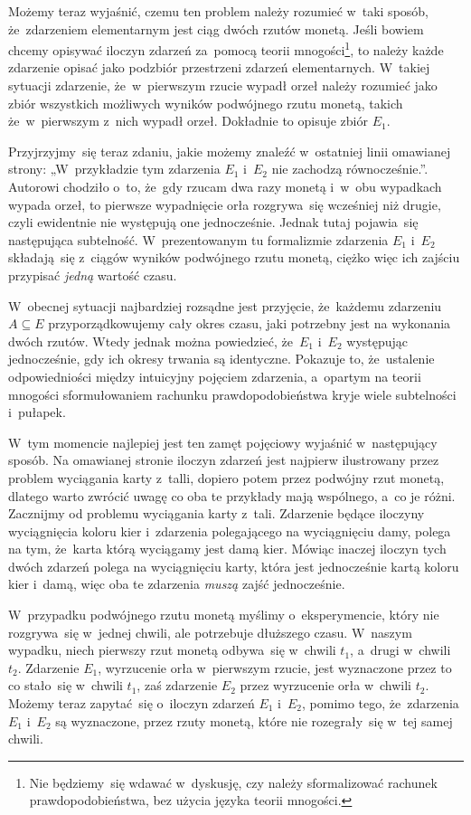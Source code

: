 \documentclass[a4paper,11pt]{article}
\numberwithin{equation}{section}
\begin{document}
Możemy teraz wyjaśnić, czemu ten problem należy rozumieć w~taki sposób,
że~zdarzeniem elementarnym jest ciąg dwóch rzutów monetą. Jeśli bowiem chcemy
opisywać iloczyn zdarzeń za~pomocą teorii mnogości\footnote{Nie będziemy~się
  wdawać w~dyskusję, czy należy sformalizować rachunek prawdopodobieństwa,
  bez użycia języka teorii mnogości.}, to należy każde zdarzenie opisać jako
podzbiór
przestrzeni zdarzeń elementarnych. W~takiej sytuacji zdarzenie,
że~w~pierwszym rzucie wypadł orzeł należy rozumieć jako zbiór wszystkich
możliwych wyników podwójnego rzutu monetą, takich że~w~pierwszym z~nich
wypadł orzeł. Dokładnie to opisuje zbiór $E_{ 1 }$.

Przyjrzyjmy~się teraz zdaniu, jakie możemy znaleźć w~ostatniej linii
omawianej strony: „W~przykładzie tym zdarzenia $E_{ 1 }$ i~$E_{ 2 }$ nie
zachodzą równocześnie.”. Autorowi chodziło o~to, że~gdy rzucam dwa razy
monetą i~w~obu wypadkach wypada orzeł, to pierwsze wypadnięcie orła
rozgrywa~się
wcześniej niż drugie, czyli ewidentnie nie występują one jednocześnie.
Jednak tutaj pojawia~się następująca subtelność. W~prezentowanym tu
formalizmie zdarzenia $E_{ 1 }$ i~$E_{ 2 }$ składają~się z~ciągów wyników
podwójnego rzutu monetą, ciężko więc ich zajściu przypisać \textit{jedną}
wartość czasu.

W~obecnej sytuacji najbardziej rozsądne jest przyjęcie, że~każdemu zdarzeniu
$A \subseteq E$ przyporządkowujemy cały okres czasu, jaki potrzebny jest na
wykonania dwóch rzutów. Wtedy jednak można powiedzieć,
że~$E_{ 1 }$ i~$E_{ 2 }$ występując
jednocześnie, gdy ich okresy trwania są identyczne. Pokazuje to, że~ustalenie
odpowiedniości między intuicyjny pojęciem zdarzenia, a~opartym na teorii
mnogości sformułowaniem rachunku prawdopodobieństwa kryje wiele subtelności
i~pułapek.

W~tym momencie najlepiej jest ten zamęt pojęciowy wyjaśnić w~następujący
sposób. Na omawianej stronie iloczyn zdarzeń jest najpierw ilustrowany przez
problem wyciągania karty z~talli, dopiero potem przez podwójny rzut monetą,
dlatego warto zwrócić uwagę co oba te przykłady mają wspólnego, a~co je
różni. Zacznijmy od problemu wyciągania karty z~tali. Zdarzenie będące
iloczyny wyciągnięcia koloru kier i~zdarzenia polegającego na
wyciągnięciu damy, polega na tym, że~karta którą wyciągamy
jest damą kier. Mówiąc inaczej iloczyn tych dwóch zdarzeń polega na
wyciągnięciu karty, która jest jednocześnie kartą koloru kier i~damą, więc
oba te zdarzenia \textit{muszą} zajść jednocześnie.

W~przypadku podwójnego rzutu monetą myślimy o~eksperymencie, który nie
rozgrywa~się w~jednej chwili, ale potrzebuje dłuższego czasu. W~naszym
wypadku, niech pierwszy rzut monetą odbywa~się w~chwili $t_{ 1 }$, a~drugi
w~chwili~$t_{ 2 }$. Zdarzenie $E_{ 1 }$, wyrzucenie orła w~pierwszym rzucie,
jest wyznaczone przez to co stało~się w~chwili $t_{ 1 }$, zaś zdarzenie
$E_{ 2 }$ przez wyrzucenie orła w~chwili $t_{ 2 }$. Możemy teraz zapytać~się
o~iloczyn zdarzeń $E_{ 1 }$ i~$E_{ 2 }$, pomimo tego, że~zdarzenia
$E_{ 1 }$ i~$E_{ 2 }$ są wyznaczone, przez rzuty monetą, które nie
rozegrały~się w~tej samej chwili.
\end{document}
